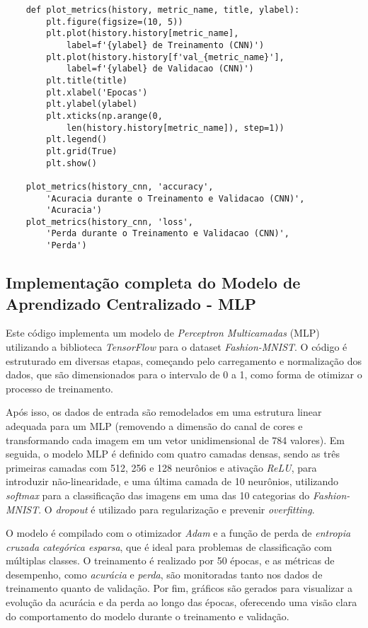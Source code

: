 \begin{lstlisting}
    def plot_metrics(history, metric_name, title, ylabel):
        plt.figure(figsize=(10, 5))
        plt.plot(history.history[metric_name], 
            label=f'{ylabel} de Treinamento (CNN)')
        plt.plot(history.history[f'val_{metric_name}'], 
            label=f'{ylabel} de Validacao (CNN)')
        plt.title(title)
        plt.xlabel('Epocas')
        plt.ylabel(ylabel)
        plt.xticks(np.arange(0, 
            len(history.history[metric_name]), step=1))
        plt.legend()
        plt.grid(True)
        plt.show()

    plot_metrics(history_cnn, 'accuracy', 
        'Acuracia durante o Treinamento e Validacao (CNN)', 
        'Acuracia')
    plot_metrics(history_cnn, 'loss', 
        'Perda durante o Treinamento e Validacao (CNN)', 
        'Perda')
\end{lstlisting}

\subsection{Implementação completa do Modelo de Aprendizado Centralizado - MLP}

Este código implementa um modelo de \textit{Perceptron Multicamadas} (MLP) utilizando a biblioteca \textit{TensorFlow} para o dataset \textit{Fashion-MNIST}. O código é estruturado em diversas etapas, começando pelo carregamento e normalização dos dados, que são dimensionados para o intervalo de 0 a 1, como forma de otimizar o processo de treinamento.

Após isso, os dados de entrada são remodelados em uma estrutura linear adequada para um MLP (removendo a dimensão do canal de cores e transformando cada imagem em um vetor unidimensional de 784 valores). Em seguida, o modelo MLP é definido com quatro camadas densas, sendo as três primeiras camadas com 512, 256 e 128 neurônios e ativação \textit{ReLU}, para introduzir não-linearidade, e uma última camada de 10 neurônios, utilizando \textit{softmax} para a classificação das imagens em uma das 10 categorias do \textit{Fashion-MNIST}. O \textit{dropout} é utilizado para regularização e prevenir \textit{overfitting}.

O modelo é compilado com o otimizador \textit{Adam} e a função de perda de \textit{entropia cruzada categórica esparsa}, que é ideal para problemas de classificação com múltiplas classes. O treinamento é realizado por 50 épocas, e as métricas de desempenho, como \textit{acurácia} e \textit{perda}, são monitoradas tanto nos dados de treinamento quanto de validação. Por fim, gráficos são gerados para visualizar a evolução da acurácia e da perda ao longo das épocas, oferecendo uma visão clara do comportamento do modelo durante o treinamento e validação.

